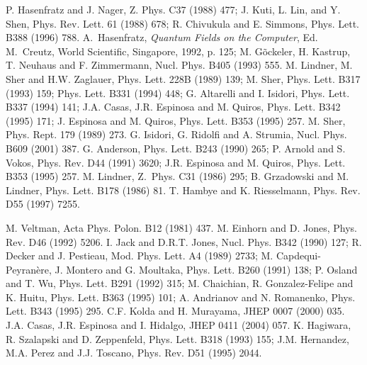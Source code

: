 \begin{thebibliography}{999}
P. Hasenfratz and J. Nager, Z. Phys. C37 (1988) 477; 
J. Kuti, L. Lin, and Y. Shen, Phys. Rev. Lett. 61 (1988) 678; 
R. Chivukula and E. Simmons, Phys. Lett. B388 (1996) 788.
%
 A.~Hasenfratz, {\it Quantum Fields on the Computer},
Ed. M.~Creutz, World Scientific, Singapore, 1992, p. 125;
M. G\~ockeler, H. Kastrup, T. Neuhaus and F. Zimmermann, Nucl. Phys. 
B405 (1993) 555.  
%
M. Lindner, M. Sher and H.W. Zaglauer, Phys. Lett. 228B (1989) 139;
M. Sher, Phys. Lett. B317 (1993) 159; \ib Phys. Lett. B331 (1994) 448;
G. Altarelli and I. Isidori, Phys. Lett. B337 (1994) 141;
J.A. Casas, J.R. Espinosa  and M. Quiros, Phys. Lett. B342 (1995) 171;
J. Espinosa and M. Quiros, Phys. Lett. B353 (1995) 257. 
%
 M. Sher, Phys. Rept. 179 (1989) 273.
%
 G. Isidori, G. Ridolfi and A. Strumia,  
Nucl. Phys. B609 (2001) 387. 
%
 G. Anderson, Phys. Lett. B243 (1990) 265;
P. Arnold and S. Vokos, Phys. Rev. D44 (1991) 3620;
J.R. Espinosa and M. Quiros, Phys. Lett. B353 (1995) 257.
%
 M. Lindner, Z.\ Phys. C31 (1986) 295;
B. Grzadowski and M. Lindner, Phys. Lett. B178 (1986) 81. 
%
 T. Hambye and K. Riesselmann, Phys. Rev. D55 (1997) 7255.

 M. Veltman, Acta Phys. Polon. B12 (1981) 437.
%
 M. Einhorn and D. Jones, Phys. Rev. D46 (1992) 5206.
%
I. Jack and D.R.T. Jones, Nucl. Phys. B342 (1990) 127; 
R. Decker and J. Pestieau, Mod. Phys. Lett. A4 (1989) 2733; 
M. Capdequi-Peyran\`ere, J. Montero and G. Moultaka, Phys. Lett. B260 (1991) 
138; P. Osland and T. Wu, Phys. Lett. B291 (1992) 315;
M. Chaichian, R. Gonzalez-Felipe and K. Huitu, Phys. Lett. B363 (1995) 101;
A. Andrianov and N. Romanenko, Phys. Lett. B343 (1995) 295.
%
 C.F. Kolda and H. Murayama, JHEP 0007 (2000) 035. 
%
 J.A. Casas, J.R. Espinosa and I. Hidalgo, 
JHEP 0411 (2004) 057. 
%
K. Hagiwara, R. Szalapski and D. Zeppenfeld, Phys. Lett. B318 (1993) 155; 
J.M. Hernandez, M.A. Perez and J.J. Toscano, Phys. Rev. D51 (1995) 2044. 


\end{thebibliography}

